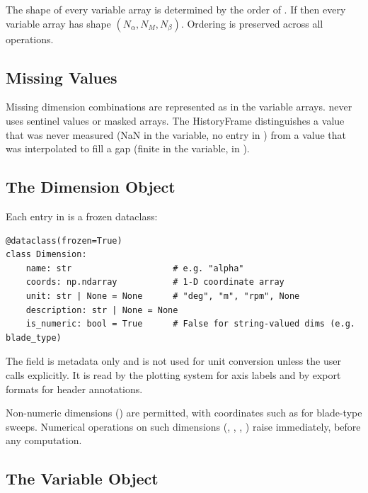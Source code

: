 The shape of every variable array is determined by the order of .
If  then every
variable array has shape $(N_\alpha, N_M, N_\beta)$. Ordering is preserved
across all operations.

\subsection{Missing Values}

Missing dimension combinations are represented as  in the
variable arrays. \itc{} never uses sentinel values or masked arrays. The
HistoryFrame distinguishes a value that was never measured (NaN in the
variable, no entry in ) from a value that was interpolated to
fill a gap (finite in the variable,  in ).

\subsection{The Dimension Object}
\label{sec:dimension-object}

Each entry in  is a frozen dataclass:

\begin{lstlisting}
@dataclass(frozen=True)
class Dimension:
    name: str                    # e.g. "alpha"
    coords: np.ndarray           # 1-D coordinate array
    unit: str | None = None      # "deg", "m", "rpm", None
    description: str | None = None
    is_numeric: bool = True      # False for string-valued dims (e.g. blade_type)
\end{lstlisting}

The  field is metadata only and is not used for unit conversion
unless the user calls  explicitly. It is read by
the plotting system for axis labels and by export formats for header
annotations.

Non-numeric dimensions () are permitted, with
coordinates such as \code{["A", "B"]} for blade-type sweeps. Numerical
operations on such dimensions (, ,
, ) raise
 immediately, before any computation.

\subsection{The Variable Object}
\label{sec:variable-object}

